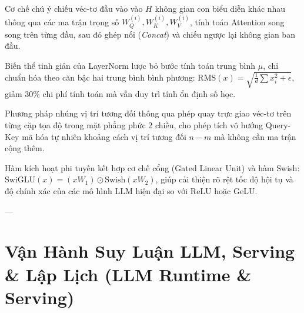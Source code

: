 \begin{description}[leftmargin=2.5cm, style=nextline]
  \item[\term{Multi-Head Attention (MHA)}] Cơ chế chú ý chiếu véc-tơ đầu vào vào $H$ không gian con biểu diễn khác nhau thông qua các ma trận trọng số $W_Q^{(i)}, W_K^{(i)}, W_V^{(i)}$, tính toán Attention song song trên từng đầu, sau đó ghép nối (\textit{Concat}) và chiếu ngược lại không gian ban đầu.

  \item[\term{RMSNorm (Root Mean Square Normalization)}] Biến thể tinh giản của LayerNorm lược bỏ bước tính toán trung bình $\mu$, chỉ chuẩn hóa theo căn bậc hai trung bình bình phương: $\text{RMS}(x) = \sqrt{\frac{1}{d}\sum x_i^2 + \epsilon}$, giảm $30\%$ chi phí tính toán mà vẫn duy trì tính ổn định số học.

  \item[\term{Rotary Position Embedding (RoPE)}] Phương pháp nhúng vị trí tương đối thông qua phép quay trực giao véc-tơ trên từng cặp tọa độ trong mặt phẳng phức 2 chiều, cho phép tích vô hướng Query-Key mã hóa tự nhiên khoảng cách vị trí tương đối $n - m$ mà không cần ma trận cộng thêm.

  \item[\term{SwiGLU}] Hàm kích hoạt phi tuyến kết hợp cơ chế cổng (Gated Linear Unit) và hàm Swish: $\text{SwiGLU}(x) = (x W_1) \odot \text{Swish}(x W_2)$, giúp cải thiện rõ rệt tốc độ hội tụ và độ chính xác của các mô hình LLM hiện đại so với ReLU hoặc GeLU.
\end{description}

---

\section{Vận Hành Suy Luận LLM, Serving \& Lập Lịch (LLM Runtime \& Serving)}
\label{sec:app-glossary-runtime}

